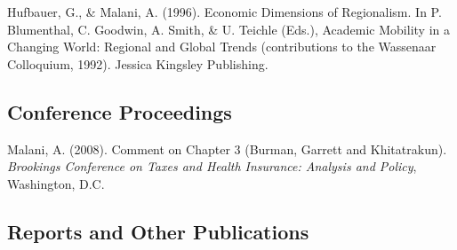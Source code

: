 \begin{tablist}
        \item[1996] \tab{}Hufbauer, G., \& Malani, A. (1996). Economic Dimensions of Regionalism. In P. Blumenthal, C. Goodwin, A. Smith, \& U. Teichle (Eds.), Academic Mobility in a Changing World: Regional and Global Trends (contributions to the Wassenaar Colloquium, 1992). Jessica Kingsley Publishing. 

    \end{tablist}


    \subsection*{Conference Proceedings}

    \begin{tablist}

        \item[2008] \tab{}Malani, A. (2008). Comment on Chapter 3 (Burman, Garrett and Khitatrakun). \textit{Brookings Conference on Taxes and Health Insurance: Analysis and Policy}, Washington, D.C.
        
    \end{tablist}

    \subsection*{Reports and Other Publications}

